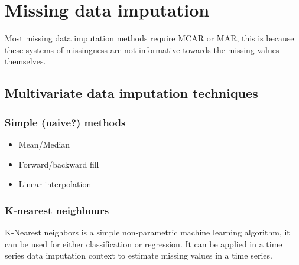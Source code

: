 \documentclass[
]{report}
\begin{document}
\hypertarget{missing-data-imputation}{%
\section{Missing data imputation}\label{missing-data-imputation}}

Most missing data imputation methods require MCAR or MAR, this is
because these systems of missingness are not informative towards the
missing values themselves. 


\hypertarget{multivariate-data-imputation-techniques}{%
\subsection{Multivariate data imputation
techniques}\label{multivariate-data-imputation-techniques}}

\hypertarget{simple-naive-methods}{%
\subsubsection{Simple (naive?) methods}\label{simple-naive-methods}}

\begin{itemize}
\item Mean/Median
\item Forward/backward fill
\item Linear interpolation
\end{itemize}

\hypertarget{k-nearest-neighbours}{%
\subsubsection{K-nearest neighbours}\label{k-nearest-neighbours}}

K-Nearest neighbors is a simple non-parametric machine learning
algorithm, it can be used for either classification or regression. It
can be applied in a time series data imputation context to estimate
missing values in a time series.
\end{document}
